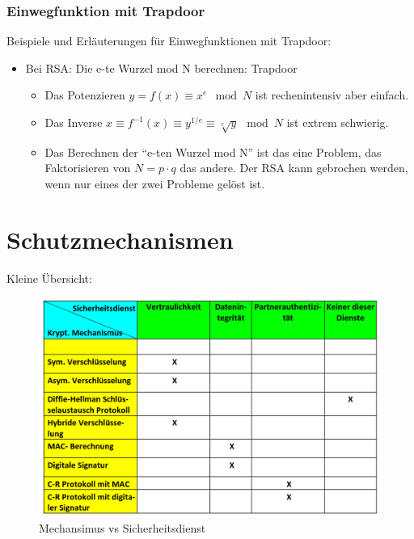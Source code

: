 \documentclass[12pt]{scrartcl}
\begin{document}
\subsubsection{Einwegfunktion mit Trapdoor}

Beispiele und Erläuterungen für Einwegfunktionen mit Trapdoor:

\begin{itemize}
    \item Bei RSA: Die e-te Wurzel mod N berechnen: Trapdoor
    \begin{itemize}
        \item Das Potenzieren $y = f(x) \equiv x^e \mod N$ ist rechenintensiv aber einfach.
        \item Das Inverse $x \equiv f^{-1}(x) \equiv y^{1/e} \equiv \sqrt[e]{y} \mod N$ ist extrem schwierig.
        \item Das Berechnen der ``e-ten Wurzel mod N''  ist das eine Problem, das
                Faktorisieren von $N = p \cdot q$ das andere. Der RSA kann gebrochen werden, wenn
                nur eines der zwei Probleme gelöst ist. 
    \end{itemize}
\end{itemize}



\newpage
\section{Schutzmechanismen}

Kleine Übersicht:
\begin{figure}[ht]
    \centering
    \includegraphics[width=\textwidth]{img/mechanismus_vs_sicherheitsdienst.png}
    \caption{Mechansimus vs Sicherheitsdienst}
    \label{fig:mechanismus_vs_sicherheitsdienst}
\end{figure}
\end{document}
